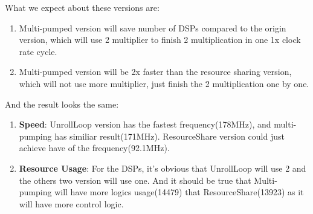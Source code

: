 What we expect about these versions are:
\begin{enumerate}
\item Multi-pumped version will save number of DSPs compared to the origin version, which will use 2 multiplier to finish 2 multiplication in one 1x clock rate cycle. 
\item Multi-pumped version will be 2x faster than the resource sharing version, which will not use more multiplier, just finish the 2 multiplication one by one. 
\end{enumerate}

And the result looks the same:
\begin{enumerate}
\item \textbf{Speed}: UnrollLoop version has the fastest frequency(178MHz), and multi-pumping has similiar result(171MHz). ResourceShare version could just achieve have of the frequency(92.1MHz).
\item \textbf{Resource Usage}: For the DSPs, it's obvious that UnrollLoop will use 2 and the others two version will use one. And it should be true that Multi-pumping will have more logics usage(14479) that ResourceShare(13923) as it will have more control logic.
\end{enumerate}

